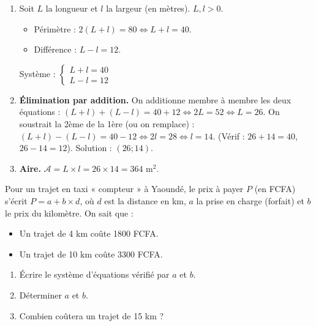 \documentclass[11pt]{article}
\begin{document}
\begin{corrige}[Exercice 2]
\begin{enumerate}
    \item Soit $L$ la longueur et $l$ la largeur (en mètres). $L, l > 0$.
    \begin{itemize}
        \item Périmètre : $2(L+l) = 80 \iff L + l = 40$.
        \item Différence : $L - l = 12$.
    \end{itemize}
    Système : $\begin{cases} L + l = 40 \\ L - l = 12 \end{cases}$

    \item \textbf{Élimination par addition.}
    On additionne membre à membre les deux équations :
    $(L+l) + (L-l) = 40 + 12 \iff 2L = 52 \iff L = 26$.
    On soustrait la 2ème de la 1ère (ou on remplace) :
    $(L+l) - (L-l) = 40 - 12 \iff 2l = 28 \iff l = 14$.
    (Vérif : $26+14=40$, $26-14=12$). Solution : $(26; 14)$.

    \item \textbf{Aire.}
    $\mathcal{A} = L \times l = 26 \times 14 = 364$ m$^2$.
\end{enumerate}
\end{corrige}

\begin{exercice}
Pour un trajet en taxi « compteur » à Yaoundé, le prix à payer $P$ (en FCFA) s'écrit $P = a + b \times d$, où $d$ est la distance en km, $a$ la prise en charge (forfait) et $b$ le prix du kilomètre.
On sait que :
\begin{itemize}
    \item Un trajet de 4 km coûte 1800 FCFA.
    \item Un trajet de 10 km coûte 3300 FCFA.
\end{itemize}
\begin{enumerate}
    \item Écrire le système d'équations vérifié par $a$ et $b$.
    \item Déterminer $a$ et $b$.
    \item Combien coûtera un trajet de 15 km ?
\end{enumerate}
\end{exercice}
\end{document}
